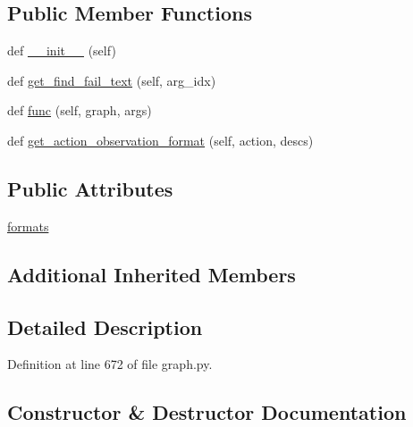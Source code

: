 \subsection*{Public Member Functions}
\begin{DoxyCompactItemize}
\item 
def \hyperlink{classlight__chats_1_1graph_1_1UseFunction_a4a49f4428084f1be52388a47f31bdd19}{\+\_\+\+\_\+init\+\_\+\+\_\+} (self)
\item 
def \hyperlink{classlight__chats_1_1graph_1_1UseFunction_a44e9ef0d0d915c32926944fd4da8e332}{get\+\_\+find\+\_\+fail\+\_\+text} (self, arg\+\_\+idx)
\item 
def \hyperlink{classlight__chats_1_1graph_1_1UseFunction_a75a1cb4d8d51f0336a3d5cd9f005e266}{func} (self, graph, args)
\item 
def \hyperlink{classlight__chats_1_1graph_1_1UseFunction_ae9056a0aa6e94b1d11be472b2549b2c2}{get\+\_\+action\+\_\+observation\+\_\+format} (self, action, descs)
\end{DoxyCompactItemize}
\subsection*{Public Attributes}
\begin{DoxyCompactItemize}
\item 
\hyperlink{classlight__chats_1_1graph_1_1UseFunction_ab5894266d221cc0d34b1e653b4bafc2d}{formats}
\end{DoxyCompactItemize}
\subsection*{Additional Inherited Members}


\subsection{Detailed Description}


Definition at line 672 of file graph.\+py.



\subsection{Constructor \& Destructor Documentation}
\mbox{\label{classlight__chats_1_1graph_1_1UseFunction_a4a49f4428084f1be52388a47f31bdd19}} 

